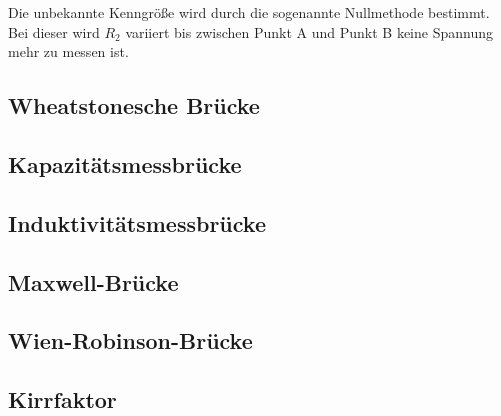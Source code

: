     Die unbekannte Kenngröße wird durch die sogenannte Nullmethode bestimmt. Bei dieser wird $R_2$ variiert bis zwischen Punkt A und Punkt B keine Spannung mehr zu
    messen ist. 
    \subsection{Wheatstonesche Brücke}
    
    \subsection{Kapazitätsmessbrücke}
    \subsection{Induktivitätsmessbrücke}
    \subsection{Maxwell-Brücke}
    \subsection{Wien-Robinson-Brücke}
    \subsection{Kirrfaktor}



